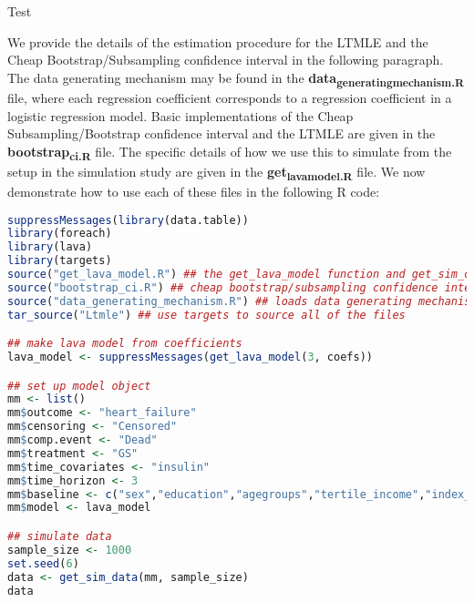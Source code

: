 \documentclass[11pt]{article}
\author{Johan Sebastian Ohlendorff}
\date{\today}
\title{}
\begin{document}
\tableofcontents

Test

We provide the details of the estimation procedure for the LTMLE
and the Cheap Bootstrap/Subsampling confidence interval in the following paragraph.
The data generating mechanism may be found in the \textbf{data\textsubscript{generating}\textsubscript{mechanism.R}} file, where
each regression coefficient corresponds to a regression coefficient in a logistic regression model.
Basic implementations of the Cheap Subsampling/Bootstrap confidence interval and the LTMLE are
given in the \textbf{bootstrap\textsubscript{ci.R}} file. The specific details of how we use this to simulate
from the setup in the simulation study are given in the \textbf{get\textsubscript{lava}\textsubscript{model.R}} file. We now demonstrate how to use
each of these files in the following R code:

\begin{lstlisting}[language=r,numbers=none]
suppressMessages(library(data.table))
library(foreach)
library(lava)
library(targets)
source("get_lava_model.R") ## the get_lava_model function and get_sim_data function
source("bootstrap_ci.R") ## cheap bootstrap/subsampling confidence intervals
source("data_generating_mechanism.R") ## loads data generating mechanism into coefs
tar_source("Ltmle") ## use targets to source all of the files

## make lava model from coefficients
lava_model <- suppressMessages(get_lava_model(3, coefs))

## set up model object
mm <- list()
mm$outcome <- "heart_failure"
mm$censoring <- "Censored"
mm$comp.event <- "Dead"
mm$treatment <- "GS"
mm$time_covariates <- "insulin"
mm$time_horizon <- 3
mm$baseline <- c("sex","education","agegroups","tertile_income","index_heart_failure","diabetes_duration", "secondline_duration","first_2ndline")
mm$model <- lava_model

## simulate data
sample_size <- 1000
set.seed(6)
data <- get_sim_data(mm, sample_size)
data
\end{lstlisting}
\end{document}
